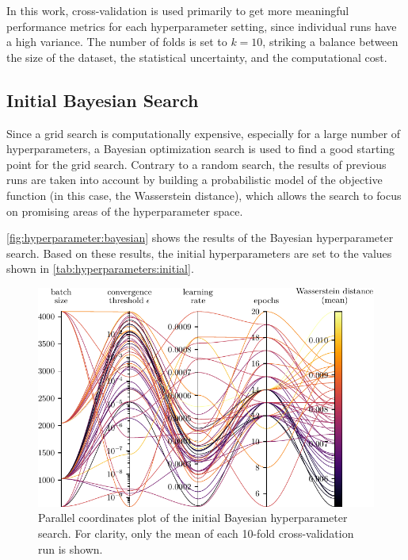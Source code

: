 In this work,
cross-validation is used primarily to get more meaningful performance metrics
for each hyperparameter setting,
  since individual runs have a high variance.
The number of folds is set to $k = 10$,
  striking a balance between
    the size of the dataset,
    the statistical uncertainty,
    and the computational cost.


\subsection{Initial Bayesian Search} \label{sec:hyperparameters:initial_bayesian}
Since a grid search is computationally expensive,
  especially for a large number of hyperparameters,
a Bayesian optimization search \cite{wandb_bayesian} is used to find a good starting point for the grid search.
Contrary to a random search,
the results of previous runs are taken into account
  by building a probabilistic model of the objective function
    (in this case, the Wasserstein distance),
  which allows the search to focus on promising areas of the hyperparameter space.


\autoref{fig:hyperparameter:bayesian} shows the results of the Bayesian hyperparameter search.
Based on these results,
the initial hyperparameters are set to the values shown in \autoref{tab:hyperparameters:initial}.


\begin{figure}
  \centering
  \includegraphics[scale=1]{content/plots/hyperparam/combined_pcplot_full.pdf}
  \caption{
    Parallel coordinates plot of the initial Bayesian hyperparameter search.
    For clarity, only the mean of each 10-fold cross-validation run is shown.
  }
  \label{fig:hyperparameter:bayesian}
\end{figure}

